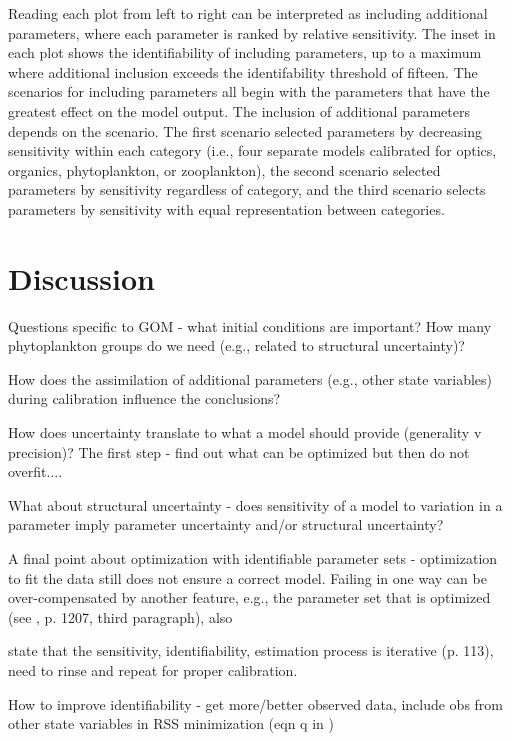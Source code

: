 \documentclass[letterpaper,12pt,oneside]{article}\usepackage[]{graphicx}\usepackage[]{color}
\begin{document}
Reading each plot from left to right can be interpreted as including additional parameters, where each parameter is ranked by relative sensitivity.  The inset in each plot shows the identifiability of including parameters, up to a maximum where additional inclusion exceeds the identifability threshold of fifteen.  The scenarios for including parameters all begin with the parameters that have the greatest effect on the model output.  The inclusion of additional parameters depends on the scenario.  The first scenario selected parameters by decreasing sensitivity within each category (i.e., four separate models calibrated for optics, organics, phytoplankton, or zooplankton), the second scenario selected parameters by sensitivity regardless of category, and the third scenario selects parameters by sensitivity with equal representation between categories. 

\section{Discussion}

Questions specific to GOM - what initial conditions are important? How many phytoplankton groups do we need (e.g., related to structural uncertainty)?

How does the assimilation of additional parameters (e.g., other state variables) during calibration influence the conclusions?

How does uncertainty translate to what a model should provide (generality v precision)?  The first step - find out what can be optimized but then do not overfit....

What about structural uncertainty - does sensitivity of a model to variation in a parameter imply parameter uncertainty and/or structural uncertainty?

A final point about optimization with identifiable parameter sets - optimization to fit the data still does not ensure a correct model.  Failing in one way can be over-compensated by another feature, e.g., the parameter set that is optimized (see \cite{Flynn05}, p. 1207, third paragraph), also \citep{Arhonditsis08}

\cite{Omlin01} state that the sensitivity, identifiability, estimation process is iterative (p. 113), need to rinse and repeat for proper calibration. 

How to improve identifiability - get more/better observed data, include obs from other state variables in RSS minimization (eqn q in \cite{Omlin01})
\end{document}
